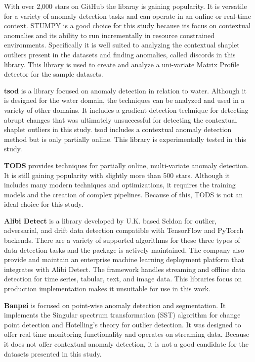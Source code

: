 With over 2,000 stars on GitHub the libaray is gaining popularity. It is versatile for a variety of anomaly detection tasks and can operate in an online or real-time context. STUMPY is a good choice for this study because its focus on contextual anomalies and its ability to run incrementally in resource constrained environments. Specifically it is well suited to analyzing the contextual shaplet  outliers present in the datasets and finding anomalies, called discords in this library. This library is used to create and analyze a uni-variate Matrix Profile detector for the sample datasets.

\textbf{tsod} \parencite{tsod} is a library focused on anomaly detection in relation to water. Although it is designed for the water domain, the techniques can be analyzed and used in a variety of other domains. It includes a gradient detection technique for detecting abrupt changes that was ultimately unsuccessful for detecting the contextual shaplet outliers in this study. tsod includes a contextual anomaly detection method but is only partially online. This library is experimentally tested in this study.

\textbf{TODS} \parencite{Lai_2021_TODS} provides techniques for partially online, multi-variate anomaly detection. It is still gaining popularity with slightly more than 500 stars. Although it includes many modern techniques and optimizations, it requires the training models and the creation of complex pipelines. Because of this, TODS is not an ideal choice for this study.

\textbf{Alibi Detect} \parencite{alibi-detect} is a library developed by U.K. based Seldon for outlier, adversarial, and drift data detection compatible with TensorFlow and PyTorch backends. There are a variety of supported algorithms for these three types of data detection tasks and the package is actively maintained. The company also provide and maintain an enterprise machine learning deployment platform that integrates with Alibi Detect. The framework handles streaming and offline data detection for time series, tabular, text, and image data. This libraries focus on production implementation makes it unsuitable for use in this work.

\textbf{Banpei} \parencite{banpei} is focused on point-wise anomaly detection and segmentation.
It implements the Singular spectrum transformation (SST) algorithm for change point detection and Hotelling's theory for outlier detection. It was designed to offer real time monitoring functionality and operates on streaming data. Because it does not offer contextual anomaly detection, it is not a good candidate for the datasets presented in this study.

